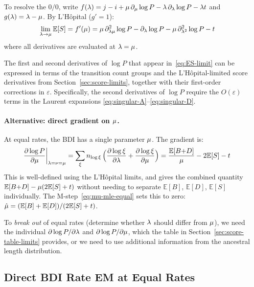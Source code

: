 To resolve the $0/0$, write
$f(\lambda) = j - i + \mu\,\partial_\mu\log P
- \lambda\,\partial_\lambda\log P - \lambda t$
and $g(\lambda) = \lambda - \mu$.
By L'H\^opital ($g' = 1$):
\begin{equation}
\lim_{\lambda\to\mu} \mathbb{E}[S]
= f'(\mu)
= \mu\,\partial^2_{\lambda\mu}\log P
  - \partial_\lambda\log P
  - \mu\,\partial^2_{\lambda^2}\log P
  - t
\label{eq:ES-limit}
\end{equation}
where all derivatives are evaluated at $\lambda = \mu$.

The first and second derivatives of $\log P$ that appear
in~\eqref{eq:ES-limit} can be expressed in terms of the
transition count groups and the L'H\^opital-limited score
derivatives from Section~\ref{sec:score-limits},
together with their first-order corrections in $\varepsilon$.
Specifically, the second derivatives of $\log P$ require
the $O(\varepsilon)$ terms in the Laurent expansions
\eqref{eq:singular-A}--\eqref{eq:singular-D}.

\paragraph{Alternative: direct gradient on $\mu$.}
At equal rates, the BDI has a single parameter $\mu$.
The gradient is:
\[
\frac{\partial\log P}{\partial\mu}\bigg|_{\lambda=\nu=\mu}
= \sum_\xi n_{\log\xi}\,
  \Bigl(\frac{\partial\log\xi}{\partial\lambda}
  + \frac{\partial\log\xi}{\partial\mu}\Bigr)
= \frac{\mathbb{E}[B{+}D]}{\mu} - 2\mathbb{E}[S] - t
\]
This is well-defined using the L'H\^opital limits,
and gives the combined quantity
$\mathbb{E}[B{+}D] - \mu(2\mathbb{E}[S]+t)$
without needing to separate $\mathbb{E}[B]$, $\mathbb{E}[D]$,
$\mathbb{E}[S]$ individually.
The M-step~\eqref{eq:mu-mle-equal} sets this to zero:
$\hat{\mu} = (\mathbb{E}[B]+\mathbb{E}[D])/(2\mathbb{E}[S]+t)$.

To \emph{break out} of equal rates (determine whether
$\lambda$ should differ from $\mu$), we need the
individual $\partial\log P/\partial\lambda$ and
$\partial\log P/\partial\mu$, which the table in
Section~\ref{sec:score-table-limits} provides,
or we need to use additional information from the ancestral length distribution.


\subsection{Direct BDI Rate EM at Equal Rates}
\label{sec:equal-rate-em}

